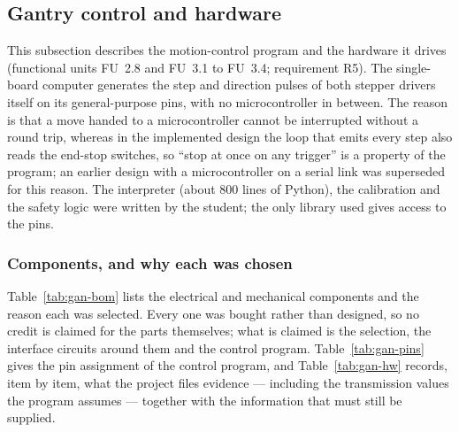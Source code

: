 \subsection{Gantry control and hardware}
\label{sec:gantry}

This subsection describes the motion-control program and the hardware it drives (functional units FU~2.8 and FU~3.1 to FU~3.4; requirement R5). The single-board computer generates the step and direction pulses of both stepper drivers itself on its general-purpose pins, with no microcontroller in between.
The reason is that a move handed to a microcontroller cannot be interrupted without a round trip, whereas in the implemented design the loop that emits every step also reads the end-stop switches, so ``stop at once on any trigger'' is a property of the program; an earlier design with a microcontroller on a serial link was superseded for this reason.
The interpreter (about 800 lines of Python), the calibration and the safety logic were written by the student; the only library used gives access to the pins.

\subsubsection{Components, and why each was chosen}
\label{sec:gan-components}

Table~\ref{tab:gan-bom} lists the electrical and mechanical components and the reason each was selected. Every one was bought rather than designed, so no credit is claimed for the parts themselves; what is claimed is the selection, the interface circuits around them and the control program.
Table~\ref{tab:gan-pins} gives the pin assignment of the control program, and Table~\ref{tab:gan-hw} records, item by item, what the project files evidence --- including the transmission values the program assumes --- together with the information that must still be supplied.

